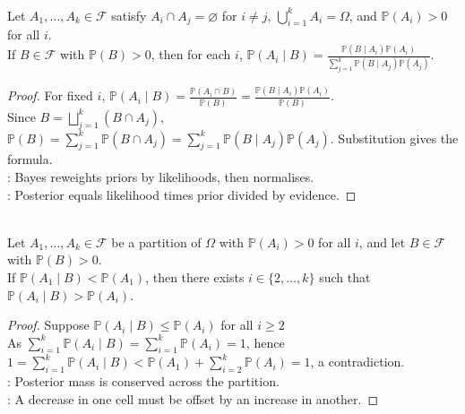 \begin{theorem} \label{thm:bayes-theorem-finite-partition} \\
Let $A_1,\ldots,A_k\in\mathcal{F}$ satisfy $A_i\cap A_j=\varnothing$ for $i\neq j$, $\bigcup\limits_{i=1}^k A_i=\Omega$, and $\mathbb{P}(A_i)>0$ for all $i$.\\
If $B\in\mathcal{F}$ with $\mathbb{P}(B)>0$, then for each $i$, $\mathbb{P}(A_i\mid B)=\frac{\mathbb{P}(B\mid A_i)\mathbb{P}(A_i)}{\sum\limits_{j=1}^{k}\mathbb{P}(B\mid A_j)\mathbb{P}(A_j)}$.
\begin{proof} For fixed $i$, $\mathbb{P}(A_i\mid B)=\frac{\mathbb{P}(A_i\cap B)}{\mathbb{P}(B)}=\frac{\mathbb{P}(B\mid A_i)\mathbb{P}(A_i)}{\mathbb{P}(B)}$.\\
Since $B=\bigsqcup\limits_{j=1}^k(B\cap A_j)$, $\mathbb{P}(B)=\sum\limits_{j=1}^k\mathbb{P}(B\cap A_j)=\sum\limits_{j=1}^k\mathbb{P}(B\mid A_j)\mathbb{P}(A_j)$. Substitution gives the formula.\\
: Bayes reweights priors by likelihoods, then normalises.\\
: Posterior equals likelihood times prior divided by evidence.
\end{proof}
\end{theorem}

\begin{corollary} \label{cor:posterior-mass-compensation} \\
Let $A_1,\ldots,A_k\in\mathcal{F}$ be a partition of $\Omega$ with $\mathbb{P}(A_i)>0$ for all $i$, and let $B\in\mathcal{F}$ with $\mathbb{P}(B)>0$.\\
If $\mathbb{P}(A_1\mid B)<\mathbb{P}(A_1)$, then there exists $i\in\{2,\ldots,k\}$ such that $\mathbb{P}(A_i\mid B)>\mathbb{P}(A_i)$.
\begin{proof} Suppose $\mathbb{P}(A_i\mid B)\leq\mathbb{P}(A_i)$ for all $i\geq2$\\
As $\sum\limits_{i=1}^k\mathbb{P}(A_i\mid B)=\sum\limits_{i=1}^k\mathbb{P}(A_i)=1$, hence $1=\sum\limits_{i=1}^k\mathbb{P}(A_i\mid B)<\mathbb{P}(A_1)+\sum\limits_{i=2}^k\mathbb{P}(A_i)=1$, a contradiction.\\
: Posterior mass is conserved across the partition.\\
: A decrease in one cell must be offset by an increase in another.
\end{proof}
\end{corollary}

